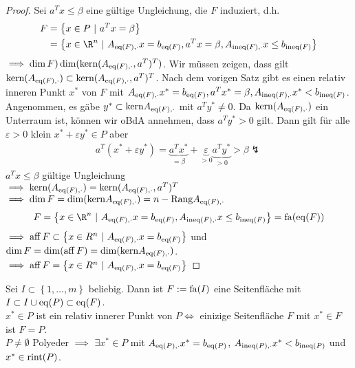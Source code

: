 \begin{proof}
	Sei $a^{T} x \leq \beta$ eine gültige Ungleichung, die $F$ induziert, d.h.
	\begin{align*}
		F &= \left\{ x \in P \ |\ a^{T} x= \beta \right\}\\
		  &= \left\{x \in \R^n \ |\ A_{\eq(F),\cdot} x = b_{\eq(F)}, a^{T} x = \beta, A_{\ineq(F),\cdot} x \leq b_{\ineq(F)} \right\}
	\end{align*}
	$\implies \dim F ) \dim(\text{kern}(A_{\operatorname{eq}(F),\cdot},a^{T} )^{T} )$.
	Wir müssen zeigen, dass gilt  $\text{kern}(A_{\operatorname{eq}(F),\cdot}) \subset  \text{kern}(A_{\operatorname{eq}(F),\cdot},a^{T} )^{T}$.
	Nach dem vorigen Satz gibt es einen relativ inneren Punkt $x^*$ von $F$ mit $A_{\operatorname{eq}(F),\cdot}x^* = b_{\operatorname{eq}(F)}, a^{T} x^* =\beta, A_{\operatorname{ineq}(F),\cdot}x^* < b_{\operatorname{ineq}(F)}$.
	Angenommen, es gäbe $y^* \subset \text{kern} A_{\operatorname{eq}(F),\cdot}$ mit $a^{T} y^* \neq 0$. Da $\text{kern}(A_{\operatorname{eq}(F),\cdot})$ ein Unterraum ist, können wir oBdA annehmen, dass $a^{T} y^* > 0 $ gilt.
	Dann gilt für alle $\varepsilon > 0$ klein $x^* + \varepsilon y^* \in P$ aber 
	\begin{align*}
		a^{T} (x^* + \varepsilon y^*) = \underbrace{a^{T} x^*}_{= \beta} + \underbrace{\varepsilon}_{>0} \underbrace{a^{T} y^*}_{>0} > \beta \lightning
	\end{align*}
	$a^{T} x \leq \beta$ gültige Ungleichung \\
	$\implies \text{kern}(A_{\operatorname{eq}(F),\cdot}) = \text{kern}( A_{\operatorname{eq}(F),\cdot}, a^{T} )^{T} $\\
	$\implies \dim F = \dim (\text{kern}A_{\operatorname{eq}(F),\cdot}  ) = n - \text{Rang}A_{\operatorname{eq}(F),\cdot} $ 
\begin{equation*}
	F = \left\{ x \in \R^n \ |\ A_{\eq(F),\cdot} x = b_{\eq(F)}, A_{\ineq(F),\cdot} x \leq b_{\ineq(F)} \right\} = \fa(\eq(F))
\end{equation*}
$\implies \aff F \subset  \left\{ x \in R^n \ |\ A_{\eq(F),\cdot}x = b_{\eq(F)} \right\}$ und $\dim F = \dim ( \operatorname{aff} F) = \dim (\text{kern}A_{\operatorname{eq}(F),\cdot})$.\\
$\implies \aff F = \left\{ x \in R^n \ |\ A_{\eq(F),\cdot}x = b_{\eq(F)} \right\}$
\end{proof}
Sei $I \subset \left\{1,\dots ,m \right\}$ beliebig. Dann ist $F:=\operatorname{fa}(I)$ eine Seitenfläche mit $I \subset  I \cup \operatorname{eq}(P) \subset \operatorname{eq}(F) $.\\
$x^* \in P$ ist ein relativ innerer Punkt von $P \iff$ einizige Seitenfläche $F$ mit $x^* \in F$ ist $F = P$.\\
$P \neq \emptyset$ Polyeder $\implies$ $\exists x^* \in P$ mit $A_{\operatorname{eq}(P),\cdot}x^* = b_{\operatorname{eq}(P)}$, $A_{\operatorname{ineq}(P),\cdot}x^* < b_{\operatorname{ineq}(P)}$ und $x^* \in \operatorname{rint}(P)$.
